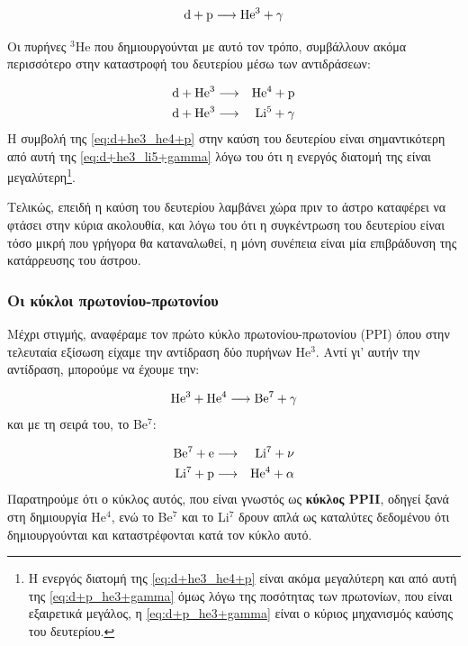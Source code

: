 \begin{eqnarray}
\rm d + p \longrightarrow \rm He^3 + \gamma \label{eq:d+p_he3+gamma}
\end{eqnarray}

Οι πυρήνες $^3$He που δημιουργούνται με αυτό τον τρόπο, συμβάλλουν ακόμα περισσότερο στην καταστροφή του δευτερίου μέσω των αντιδράσεων:

\begin{eqnarray}
\rm d + He^3 & \longrightarrow & \rm He^4 + p \label{eq:d+he3_he4+p}\\
\rm d + He^3 & \longrightarrow & \rm Li^5 + \gamma \label{eq:d+he3_li5+gamma}
\end{eqnarray}
Η συμβολή της \eqref{eq:d+he3_he4+p} στην καύση του δευτερίου είναι σημαντικότερη από αυτή της \eqref{eq:d+he3_li5+gamma} λόγω του ότι η ενεργός διατομή της είναι μεγαλύτερη\footnote{Η ενεργός διατομή της \eqref{eq:d+he3_he4+p} είναι ακόμα μεγαλύτερη και από αυτή της \eqref{eq:d+p_he3+gamma} όμως λόγω της ποσότητας των πρωτονίων, που είναι εξαιρετικά μεγάλος, η \eqref{eq:d+p_he3+gamma} είναι ο κύριος μηχανισμός καύσης του δευτερίου.}.

Τελικώς, επειδή η καύση του δευτερίου λαμβάνει χώρα πριν το άστρο καταφέρει να φτάσει στην κύρια ακολουθία, και λόγω του ότι η συγκέντρωση του δευτερίου είναι τόσο μικρή που γρήγορα θα καταναλωθεί, η μόνη συνέπεια είναι μία επιβράδυνση της κατάρρευσης του άστρου.
\subsubsection{Οι κύκλοι πρωτονίου-πρωτονίου}
Μέχρι στιγμής, αναφέραμε τον πρώτο κύκλο πρωτονίου-πρωτονίου (PPI) όπου στην τελευταία εξίσωση είχαμε την αντίδραση δύο πυρήνων He$^3$. Αντί γι' αυτήν την αντίδραση, μπορούμε να έχουμε την:

\begin{eqnarray}
\rm He^3 + He^4 \longrightarrow \rm Be^7 + \gamma \label{eq:he3+he4_be7+gamma}
\end{eqnarray}
και με τη σειρά του, το Be$^7$:

\begin{eqnarray}
\rm Be^7 + e & \longrightarrow & \rm Li^7 + \nu \label{eq:be7+e_li7+nu}\\
\rm Li^7 + p & \longrightarrow & \rm He^4 + \alpha \label{eq:li7+p_he4+alpha}
\end{eqnarray}
Παρατηρούμε ότι ο κύκλος αυτός, που είναι γνωστός ως \textbf{κύκλος PPII}, οδηγεί ξανά στη δημιουργία He$^4$, ενώ το Be$^7$ και το Li$^7$ δρουν απλά ως καταλύτες δεδομένου ότι δημιουργούνται και καταστρέφονται κατά τον κύκλο αυτό.

